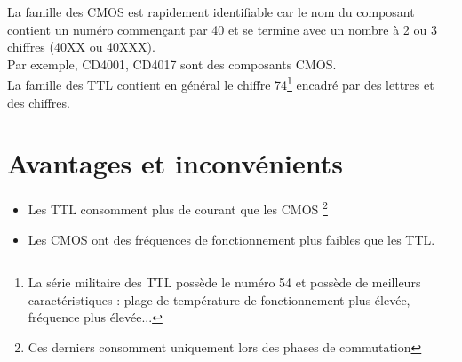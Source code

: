 La famille des CMOS est rapidement identifiable car le nom du composant contient un numéro commençant par 40 et se termine avec un nombre à 2 ou 3 chiffres (40XX ou 40XXX). \\

Par exemple, CD4001, CD4017 sont des composants CMOS. \\



La famille des TTL contient en général le chiffre 74\footnote{La série militaire des TTL possède le numéro 54 et possède de meilleurs caractéristiques : plage de température de fonctionnement plus élevée, fréquence plus élevée...} encadré par des lettres et des chiffres. \\





\section{Avantages et inconvénients}

\begin{itemize}
    \item Les TTL consomment plus de courant que les CMOS \footnote{Ces derniers consomment uniquement lors des phases de commutation}
    \item Les CMOS ont des fréquences de fonctionnement plus faibles que les TTL.
\end{itemize}


